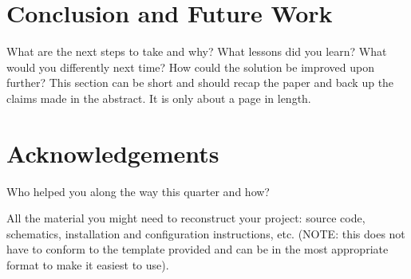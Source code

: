 \documentclass{acm_proc_article-sp}
\begin{document}
\section{Conclusion and Future Work}
What are the next steps to take and why?  What lessons did you learn?  What would you differently next time?  How could the solution be improved upon further?  This section can be short and should recap the paper and back up the claims made in the abstract.  It is only about a page in length.

\section{Acknowledgements}
Who helped you along the way this quarter and how?


  
\balancecolumns

\appendix
All the material you might need to reconstruct your project: source code, schematics, installation and configuration instructions, etc.  (NOTE: this does not have to conform to the template provided and can be in the most appropriate format to make it easiest to use).
\end{document}
